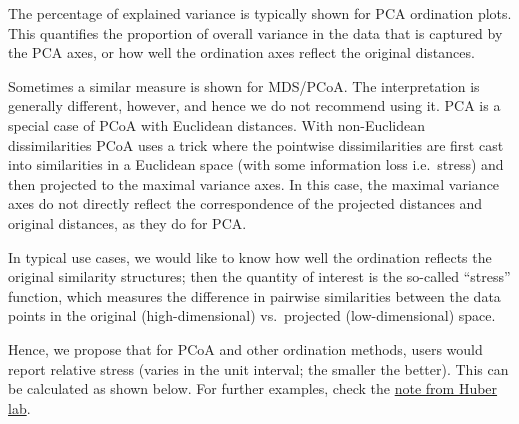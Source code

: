\documentclass[
]{book}
\begin{document}
The percentage of explained variance is typically shown for PCA
ordination plots. This quantifies the proportion of overall variance
in the data that is captured by the PCA axes, or how well the
ordination axes reflect the original distances.

Sometimes a similar measure is shown for MDS/PCoA. The interpretation
is generally different, however, and hence we do not recommend using
it. PCA is a special case of PCoA with Euclidean distances. With
non-Euclidean dissimilarities PCoA uses a trick where the pointwise
dissimilarities are first cast into similarities in a Euclidean space
(with some information loss i.e.~stress) and then projected to the
maximal variance axes. In this case, the maximal variance axes do not
directly reflect the correspondence of the projected distances and
original distances, as they do for PCA.

In typical use cases, we would like to know how well the ordination
reflects the original similarity structures; then the quantity of
interest is the so-called ``stress'' function, which measures the
difference in pairwise similarities between the data points in the
original (high-dimensional) vs.~projected (low-dimensional) space.

Hence, we propose that for PCoA and other ordination methods, users
would report relative stress (varies in the unit interval; the smaller
the better). This can be calculated as shown below. For further
examples, check the \href{https://www.huber.embl.de/users/klaus/Teaching/statisticalMethods-lab.pdf}{note from Huber
lab}.
\end{document}
